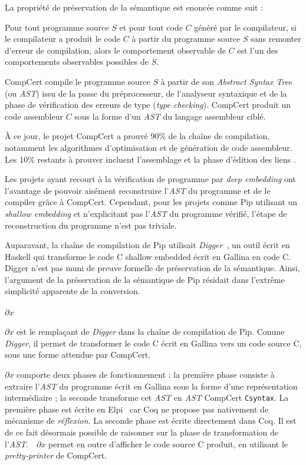 	La propriété de préservation de la sémantique est enoncée comme suit :

\begin{theorem}	
	Pour tout programme source $S$ et pour tout code $C$ généré par le compilateur, si le compilateur a produit le code $C$ à partir du programme source $S$ sans remonter d'erreur de compilation, alors le comportement observable de $C$ est l'un des comportements observables possibles de $S$.
\end{theorem}

CompCert compile le programme source $S$ à partir de son \emph{Abstract Syntax Tree} (ou \emph{AST}) issu de la passe du préprocesseur, de l'analyseur syntaxique et de la phase de vérification des erreurs de type (\emph{type checking}). CompCert produit un code assembleur $C$ sous la forme d'un \emph{AST} du langage assembleur ciblé.

À ce jour, le projet CompCert a prouvé 90\% de la chaîne de compilation, notamment les algorithmes d'optimisation et de génération de code assembleur. Les 10\% restants à prouver incluent l'assemblage et la phase d'édition des liens \cite{compcert_online}.

Les projets ayant recourt à la vérification de programme par \emph{deep embedding} ont l'avantage de pouvoir aisément reconstruire l'\emph{AST} du programme et de le compiler grâce à CompCert. Cependant, pour les projets comme Pip utilisant un \emph{shallow embedding} et n'explicitant pas l'\emph{AST} du programme vérifié, l'étape de reconstruction du programme n'est pas triviale.

Auparavant, la chaîne de compilation de Pip utilisait \emph{Digger}~\cite{digger}, un outil écrit en Haskell qui transforme le code C shallow embedded écrit en Gallina en code C. Digger n'est pas muni de preuve formelle de préservation de la sémantique. Ainsi, l'argument de la préservation de la sémantique de Pip résidait dans l'extrême simplicité apparente de la conversion.

		\paragraph{$\partial x$} $\partial x$ est le remplaçant de \emph{Digger} dans la chaîne de compilation de Pip. Comme \emph{Digger}, il permet de transformer le code C écrit en Gallina vers un code source C, sous une forme attendue par CompCert.

		$\partial x$ comporte deux phases de fonctionnement : la première phase consiste à extraire l'\emph{AST} du programme écrit en Gallina sous la forme d'une représentation intermédiaire ; la seconde transforme cet \emph{AST} en \emph{AST} CompCert \texttt{Csyntax}. La première phase est écrite en Elpi~\cite{elpi} car Coq ne propose pas nativement de mécanisme de \emph{réflexion}. La seconde phase est écrite directement dans Coq. Il est de ce fait désormais possible de raisonner sur la phase de transformation de l'\emph{AST}.~~$\partial x$ permet en outre d'afficher le code source C produit, en utilisant le \emph{pretty-printer} de CompCert.

